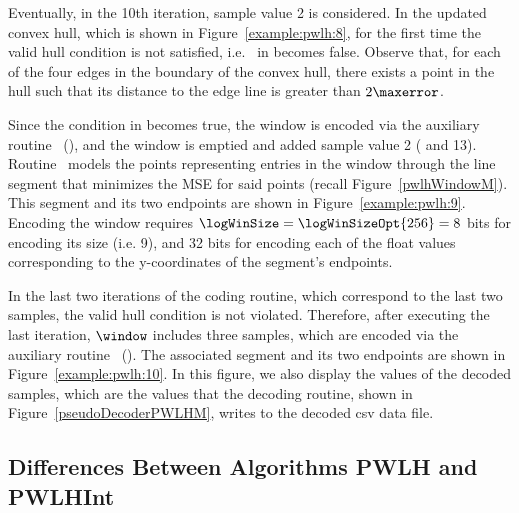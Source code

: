 \clearpage


Eventually, in the 10th iteration, sample value 2 is considered. In the updated convex hull, which is shown in Figure~\ref{example:pwlh:8}, for the first time the valid hull condition is not satisfied, i.e. \validHull\ in  becomes false. Observe that, for each of the four edges in the boundary of the convex hull, there exists a point in the hull such that its distance to the edge line is greater than $2\maxerror$. 


\vspace{+5pt}


Since the condition in  becomes true, the window is encoded via the auxiliary routine \EncodeWindow\ (), and the window is emptied and added sample value 2 ( and 13). Routine \EncodeWindow\ models the points representing entries in the window through the line segment that minimizes the MSE for said points (recall Figure~\ref{pwlhWindowM}). This segment and its two endpoints are shown in Figure~\ref{example:pwlh:9}. Encoding the window requires $\logWinSize = \logWinSizeOpt{256}=8$ bits for encoding its size (i.e. 9), and 32 bits for encoding each of the float values corresponding to the y-coordinates of the segment's endpoints.


\vspace{+5pt}


\clearpage


In the last two iterations of the coding routine, which correspond to the last two samples, the valid hull condition is not violated. Therefore, after executing the last iteration, $\window$ includes three samples, which are encoded via the auxiliary routine \EncodeLastWindowPWLH\ (). The associated segment and its two endpoints are shown in Figure~\ref{example:pwlh:10}. In this figure, we also display the values of the decoded samples, which are the values that the decoding routine, shown in Figure~\ref{pseudoDecoderPWLHM}, writes to the decoded csv data file. 






\subsection{Differences Between Algorithms PWLH and PWLHInt}
\label{algo:pwhl:int}


